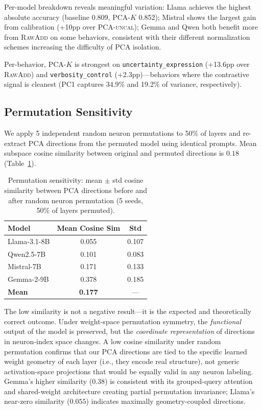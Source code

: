\documentclass{article}
\begin{document}
Per-model breakdown reveals meaningful variation:
Llama achieves the highest absolute accuracy (baseline 0.809, \textsc{PCA-$K$} 0.852);
Mistral shows the largest gain from calibration (+10pp over \textsc{PCA-uncal});
Gemma and Qwen both benefit more from \textsc{RawAdd} on some behaviors, consistent with
their different normalization schemes increasing the difficulty of PCA isolation.

Per-behavior, \textsc{PCA-$K$} is strongest on \texttt{uncertainty\_expression}
(+13.6pp over \textsc{RawAdd}) and \texttt{verbosity\_control} (+2.3pp)—behaviors
where the contrastive signal is cleanest (PC1 captures 34.9\% and 19.2\% of variance,
respectively).

\subsection{Permutation Sensitivity}
\label{sec:exp_perm}

We apply 5 independent random neuron permutations to 50\% of layers and re-extract
PCA directions from the permuted model using identical prompts.
Mean subspace cosine similarity between original and permuted directions is $0.18$
(Table~\ref{tab:perm}).

\begin{table}[h]
\centering
\caption{Permutation sensitivity: mean $\pm$ std cosine similarity between PCA
directions before and after random neuron permutation (5 seeds, 50\% of layers permuted).}
\label{tab:perm}
\begin{tabular}{lcc}
\toprule
Model & Mean Cosine Sim & Std \\
\midrule
Llama-3.1-8B  & 0.055 & 0.107 \\
Qwen2.5-7B    & 0.101 & 0.083 \\
Mistral-7B    & 0.171 & 0.133 \\
Gemma-2-9B    & 0.378 & 0.185 \\
\midrule
\textbf{Mean} & \textbf{0.177} & --- \\
\bottomrule
\end{tabular}
\end{table}

The low similarity is not a negative result—it is the expected and theoretically correct
outcome.
Under weight-space permutation symmetry, the \emph{functional} output of the model is
preserved, but the \emph{coordinate representation} of directions in neuron-index space
changes.
A low cosine similarity under random permutation confirms that our PCA directions are
tied to the specific learned weight geometry of each layer (i.e., they encode real
structure), not generic activation-space projections that would be equally valid in any
neuron labeling.
Gemma's higher similarity ($0.38$) is consistent with its grouped-query attention and
shared-weight architecture creating partial permutation invariance; Llama's near-zero
similarity ($0.055$) indicates maximally geometry-coupled directions.
\end{document}
